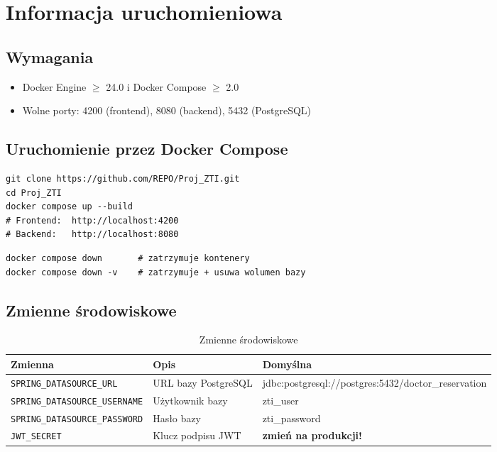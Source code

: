\documentclass[12pt, a4paper]{article}
\begin{document}
\section{Informacja uruchomieniowa}

\subsection{Wymagania}

\begin{itemize}
  \item Docker Engine $\geq$ 24.0 i Docker Compose $\geq$ 2.0
  \item Wolne porty: 4200 (frontend), 8080 (backend), 5432 (PostgreSQL)
\end{itemize}

\subsection{Uruchomienie przez Docker Compose}

\begin{lstlisting}[style=bash]
git clone https://github.com/REPO/Proj_ZTI.git
cd Proj_ZTI
docker compose up --build
# Frontend:  http://localhost:4200
# Backend:   http://localhost:8080
\end{lstlisting}

\begin{lstlisting}[style=bash]
docker compose down       # zatrzymuje kontenery
docker compose down -v    # zatrzymuje + usuwa wolumen bazy
\end{lstlisting}

\subsection{Zmienne środowiskowe}

\begin{table}[H]
\centering
\begin{tabularx}{\textwidth}{lXl}
\toprule
\textbf{Zmienna} & \textbf{Opis} & \textbf{Domyślna} \\
\midrule
\texttt{SPRING\_DATASOURCE\_URL}      & URL bazy PostgreSQL & jdbc:postgresql://postgres:5432/doctor\_reservation \\
\texttt{SPRING\_DATASOURCE\_USERNAME} & Użytkownik bazy     & zti\_user \\
\texttt{SPRING\_DATASOURCE\_PASSWORD} & Hasło bazy          & zti\_password \\
\texttt{JWT\_SECRET}                  & Klucz podpisu JWT   & \textbf{zmień na produkcji!} \\
\bottomrule
\end{tabularx}
\caption{Zmienne środowiskowe}
\end{table}
\end{document}
